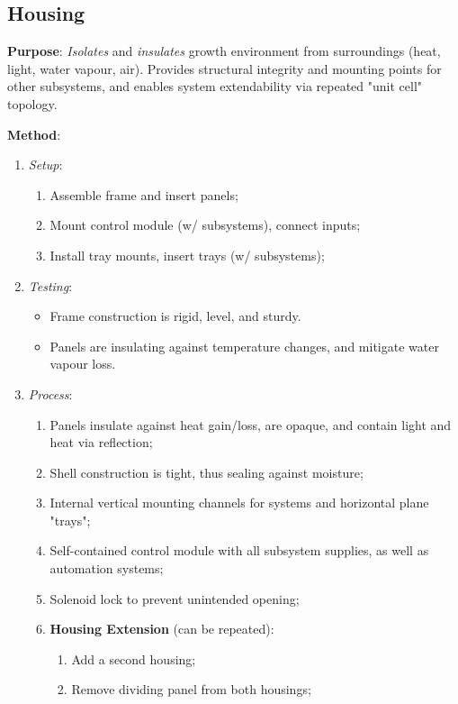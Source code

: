 \subsection{Housing}
\label{sec:housing}

\textbf{Purpose}: \textit{Isolates} and \textit{insulates} growth environment from surroundings (heat, light, water vapour, air). Provides structural integrity and mounting points for other subsystems, and enables system extendability via repeated "unit cell" topology.

\textbf{Method}:
\begin{enumerate}
    \item \textit{Setup}:
    \begin{enumerate}
        \item Assemble frame and insert panels;
        \item Mount control module (w/ subsystems), connect inputs;
        \item Install tray mounts, insert trays (w/ subsystems);
    \end{enumerate}
    \item \textit{Testing}:
    \begin{itemize}
        \item Frame construction is rigid, level, and sturdy.
        \item Panels are insulating against temperature changes, and mitigate water vapour loss.
    \end{itemize}
    \item \textit{Process}:
    \begin{enumerate}
        \item Panels insulate against heat gain/loss, are opaque, and contain light and heat via reflection;
        \item Shell construction is tight, thus sealing against moisture;
        \item Internal vertical mounting channels for systems and horizontal plane "trays";
        \item Self-contained control module with all subsystem supplies, as well as automation systems;
        \item Solenoid lock to prevent unintended opening;
        \item \textbf{Housing Extension} (can be repeated):
        \begin{enumerate}
            \item Add a second housing;
            \item Remove dividing panel from both housings;

\end{enumerate}
\end{enumerate}
\end{enumerate}
